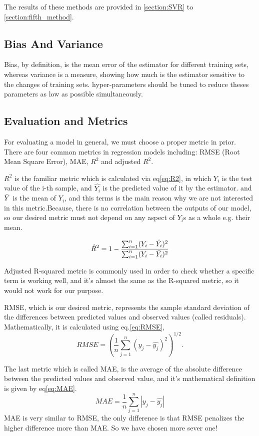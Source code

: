 \documentclass[a4paper,12pt]{article}
\begin{document}
\begin{multicols}{2}
The results of these methods are provided in \ref{section:SVR} to \ref{section:fifth_method}.
\subsection{Bias And Variance}
Bias, by definition, is the mean error of the estimator for different training sets, whereas variance is a measure, showing how much is the estimator sensitive to the changes of training sets. hyper-parameters should be tuned to reduce theses parameters as low as possible simultaneously.
\subsection{Evaluation and Metrics}
\label{section:metrics}
For evaluating a model in general, we must choose a proper metric in prior. There are four common metrics in regression models\cite{metric} including: RMSE (Root Mean Square Error), MAE, $R^2$ and adjusted $R^2$.

$R^2$ is the familiar metric which is calculated via eq\ref{eq:R2}, in which $Y_i$ is the test value of the i-th sample, and $\hat{Y_i}$ is the predicted value of it by the estimator. and $\Bar{Y}$ is the mean of $Y_i$, and this terms is the main reason why we are not interested in this metric.Because, there is no correlation between the outputs of our model, so our desired metric must not depend on any aspect of $Y_i$s as a whole e.g. their mean.

\begin{equation}
    \hat{R}^2 = 1-\frac{\sum_{i=1}^n (Y_i - \hat{Y_i})^2}{\sum_{i=1}^n (Y_i - \Bar{Y_i})^2}
    \label{eq:R2}
\end{equation}

Adjusted R-squared metric is commonly used in order to check whether a specific term is working well, and it's almost the same as the R-squared metric, so it would not work for our purpose. 

RMSE, which is our desired metric, represents the sample standard deviation of the differences between predicted values and observed values (called residuals). Mathematically, it is calculated using eq.\ref{eq:RMSE},
\begin{equation}
    RMSE = ( \frac{1}{n} \sum_{j=1}^n (y_j - \hat{y_j})^2)^{1/2}.
    \label{eq:RMSE}
\end{equation}

The last metric which is called MAE, is the average of the absolute difference between the predicted values and observed value, and it's mathematical definition is given by eq\ref{eq:MAE}.
\begin{equation}
    MAE =  \frac{1}{n} \sum_{j=1}^n |y_j - \hat{y_j}|
    \label{eq:MAE}
\end{equation}
MAE is very similar to RMSE, the only difference is that RMSE penalizes the higher difference more than MAE. So  we have chosen more sever one!


\end{multicols}
\end{document}
